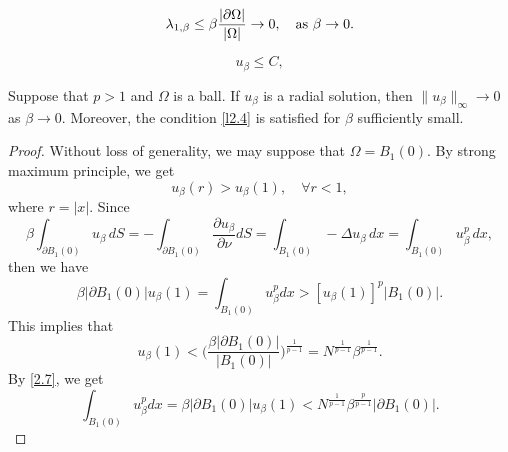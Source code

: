 \documentclass[10pt,a4paper]{amsart}
\begin{document}
\begin{equation}\label{2.7}
\lambda_{1,\beta}\le\beta\frac{|\partial\Omega|}{|\Omega|}\to0,\quad\hbox{as }\beta\to0.
\end{equation}

\begin{equation}\label{l2.4}
u_\beta\le C,
\end{equation}

\begin{lemma}\label{lemma2.6}
Suppose that $p>1$ and $\Omega$ is a ball. If $u_\beta$ is a radial solution, then 
$\|u_\beta\|_{\infty}\to 0$  as $\beta\to 0$. Moreover, the condition \eqref{l2.4} is satisfied for $\beta$ sufficiently small.
\end{lemma}

\begin{proof}
Without loss of generality, we may suppose that $\Omega=B_{1}(0)$. By strong maximum principle, we get 
\begin{equation*}
u_\beta(r)>u_\beta(1),\quad \forall r<1,
\end{equation*}
where $r=|x|$. Since 
\begin{equation}
\beta\int_{\partial B_1(0)}u_\beta\, dS
=-\int_{\partial B_1(0)}\frac{\partial u_\beta}{\partial\nu}dS
=\int_{B_1(0)}-\Delta u_\beta\, dx
=\int_{B_1(0)}u_\beta^p\, dx,
\end{equation}
then we have 
$$
\beta |\partial B_1(0)|u_\beta(1)=\int_{B_1(0)}u_\beta^pdx>[u_\beta(1)]^p| B_1(0)|.
$$
This implies that 
$$
u_\beta(1)<\Big( \frac{\beta |\partial B_1(0)|}{| B_1(0)|}\Big)^{\frac{1}{p-1}}=N^{\frac{1}{p-1}}\beta^{\frac{1}{p-1}}.
$$
By \eqref{2.7}, we get 
\begin{equation}\label{2.8}
\int_{B_1(0)}u_\beta^pdx=\beta |\partial B_1(0)|u_\beta(1)<N^{\frac{1}{p-1}}\beta^{\frac{p}{p-1}}|\partial B_1(0)|.
\end{equation}


\end{proof}
\end{document}
